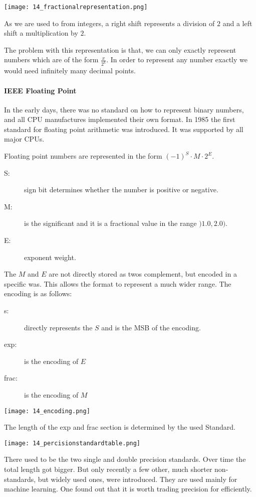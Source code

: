 \texttt{[image: 14\_fractionalrepresentation.png]}

As we are used to from integers, a right shift represents a division of $2$ and a left shift a multiplication by $2$. 

The problem with this representation is that, we can only exactly represent numbers which are of the form $\frac{x}{2^k}$. In order to represent any number exactly we would need infinitely many decimal points.

\paragraph{IEEE Floating Point}
In the early days, there was no standard on how to represent binary numbers, and all CPU manufactures implemented their own format. In 1985 the first standard for floating point arithmetic was introduced. It was supported by all major CPUs.

Floating point numbers are represented in the form $(-1)^S \cdot M \cdot 2^E$.
\begin{description}
    \item[S:] sign bit determines whether the number is positive or negative.
    \item[M:] is the significant and it is a fractional value in the range $)1.0, 2.0)$.
    \item[E:] exponent weight.
\end{description}

The $M$ and $E$ are not directly stored as twos complement, but encoded in a specific was. This allows the format to represent a much wider range. The encoding is as follows:
\begin{description}
    \item[s:] directly represents the $S$ and is the MSB of the encoding.
    \item[exp:] is the encoding of $E$
    \item[frac:] is the encoding of $M$
\end{description}

\texttt{[image: 14\_encoding.png]}

The length of the exp and frac section is determined by the used Standard.

\texttt{[image: 14\_percisionstandardtable.png]}

There used to be the two single and double precision standards. Over time the total length got bigger. But only recently a few other, much shorter non-standards, but widely used ones, were introduced. They are used mainly for machine learning. One found out that it is worth trading precision for efficiently.

